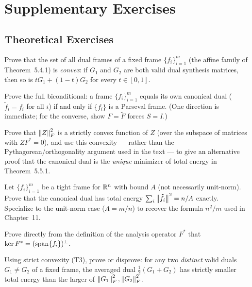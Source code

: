 \section{Supplementary Exercises}
\label{sec:extra-ch5}

\subsection*{Theoretical Exercises}
\begin{theoexercises}
	\item Prove that the set of all dual frames of a fixed frame
	$\{f_i\}_{i=1}^m$ (the affine family of Theorem~5.4.1) is
	\emph{convex}: if $G_1$ and $G_2$ are both valid dual synthesis
	matrices, then so is $tG_1+(1-t)G_2$ for every $t\in[0,1]$.
	
	\item Prove the full biconditional: a frame $\{f_i\}_{i=1}^m$ equals its
	own canonical dual ($\tilde f_i=f_i$ for all $i$) if and only if
	$\{f_i\}$ is a Parseval frame. (One direction is immediate;
	for the converse, show $F=\tilde F$ forces $S=I$.)
	
	\item Prove that $\left\| Z \right\|_F^2$ is a strictly convex function of $Z$
	(over the subspace of matrices with $ZF^*=0$), and use this
	convexity --- rather than the Pythagorean/orthogonality argument
	used in the text --- to give an alternative proof that the
	canonical dual is the \emph{unique} minimizer of total energy in
	Theorem~5.5.1.
	
	\item Let $\{f_i\}_{i=1}^m$ be a tight frame for $\mathbb{R}^n$ with bound $A$
	(not necessarily unit-norm). Prove that the canonical dual has
	total energy $\sum_i\left\| \tilde f_i \right\|^2=n/A$ exactly. Specialize
	to the unit-norm case ($A=m/n$) to recover the formula $n^2/m$
	used in Chapter~11.
	
	\item Prove directly from the definition of the analysis operator
	$F^*$ that $\ker F^*=(\operatorname{span}\{f_i\})^\perp$.
	
	\item Using strict convexity (T3), prove or disprove: for any two
	\emph{distinct} valid duals $G_1\ne G_2$ of a fixed frame, the
	averaged dual $\tfrac12(G_1+G_2)$ has strictly smaller total
	energy than the larger of $\left\| G_1 \right\|_F^2,\left\| G_2 \right\|_F^2$.
\end{theoexercises}

